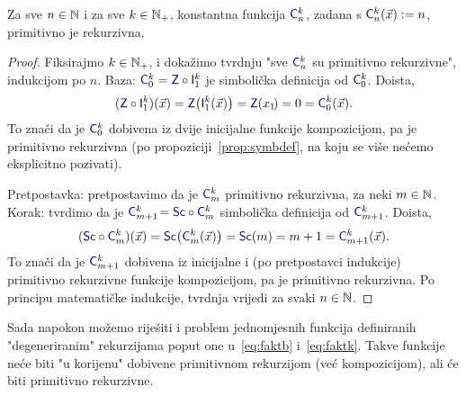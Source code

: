 \begin{propozicija}[{name=[primitivna rekurzivnost konstantnih funkcija]}]\label{prop:konst}
Za sve $n\in{\mathbb N}$ i za sve $k\in{\mathbb N}_+$, konstantna funkcija $\f C_n^k$, zadana s $\f C_n^k(\vec x):=n$, primitivno je rekurzivna.
\end{propozicija}
\begin{proof}
Fiksirajmo $k\in{\mathbb N}_+$, i dokažimo tvrdnju "sve $\f C_n^k$ su primitivno rekurzivne", indukcijom po $n$. Baza: $\f C_0^k=\f Z\circ\f I_1^k$ je simbolička definicija od $\f C_0^k$. Doista,
\begin{equation}
    (\f Z\circ\f I_1^k)(\vec x)=\f Z\bigl(\f I_1^k(\vec x)\bigr)=\f Z(x_1\!)=0=\f C_0^k(\vec x)\text.
\end{equation}
To znači da je $\f C_0^k$ dobivena iz dvije inicijalne funkcije kompozicijom, pa je primitivno rekurzivna (po propoziciji~\ref{prop:symbdef}, na koju se više nećemo eksplicitno pozivati).

Pretpostavka: pretpostavimo da je $\f C_m^k$ primitivno rekurzivna, za neki $m\in{\mathbb N}$. 
Korak: tvrdimo da je $\f C_{m+1}^k\!=\f{Sc}\circ\f C_m^k$ simbolička definicija od $\f C_{m+1}^k$. Doista,
\begin{equation}
    (\f{Sc}\circ\f C_m^k)(\vec x)=\f{Sc}\bigl(\f C_m^k(\vec x)\bigr)=\f{Sc}(m)=m+1=\f C_{m+1}^k(\vec x)\text.
\end{equation}
To znači da je $\f C_{m+1}^k$ dobivena iz inicijalne i (po pretpostavci indukcije) primitivno rekurzivne funkcije kompozicijom, pa je primitivno rekurzivna. Po principu matematičke indukcije, tvrdnja vrijedi za svaki $n\in{\mathbb N}$.
\end{proof}

Sada napokon možemo riješiti i problem jednomjesnih funkcija definiranih "degeneriranim" rekurzijama poput one u~\eqref{eq:faktb} i~\eqref{eq:faktk}. Takve funkcije neće biti "u korijenu" dobivene primitivnom rekurzijom (već kompozicijom), ali će biti primitivno rekurzivne.

